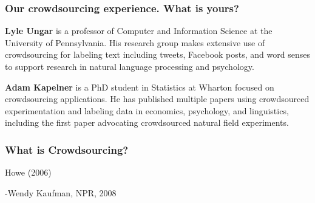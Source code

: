 \documentclass[slides]{beamer} %
\begin{document}
\begin{frame}\frametitle{Our crowdsourcing experience. What is yours?}


\begin{center}
\begin{minipage}{0.2\linewidth}
\centering
{}
\end{minipage}
\begin{minipage}{0.78\linewidth}
\scriptsize \textbf{Lyle Ungar} is a professor of Computer and
Information Science at the University of Pennsylvania. His research
group makes extensive use of crowdsourcing for labeling text including tweets, Facebook posts, and word senses 
to support research in natural language processing and psychology.

\end{minipage}
\end{center}

\begin{center}
\begin{minipage}{0.2\linewidth}
\centering
{}
\end{minipage}
\begin{minipage}{0.78\linewidth}
\scriptsize
\textbf{Adam Kapelner} is a PhD student in Statistics at Wharton focused on crowdsourcing applications. He has published multiple papers using crowdsourced experimentation and labeling data in economics, psychology, and linguistics, including the first paper advocating crowdsourced natural field experiments.
\end{minipage}
\end{center}

\end{frame}

\begin{frame}\frametitle{What is Crowdsourcing?}

 Howe (2006)

 \pause

 -Wendy Kaufman, NPR, 2008

\end{frame}
\end{document}
